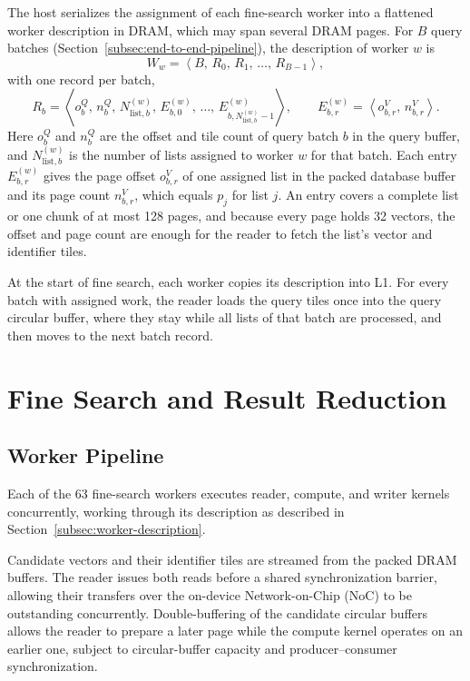 The host serializes the assignment of each fine-search worker into a
flattened worker description in DRAM, which may span several DRAM pages. For
\(B\) query batches (Section~\ref{subsec:end-to-end-pipeline}), the
description of worker \(w\) is
\begin{equation}
W_w=\left\langle B,\,R_0,\,R_1,\,\ldots,\,R_{B-1}\right\rangle,
\label{eq:worker-description}
\end{equation}
with one record per batch,
\begin{equation}
R_b=\left\langle o^{Q}_b,\,n^{Q}_b,\,N^{(w)}_{\mathrm{list},b},\,
E^{(w)}_{b,0},\,\ldots,\,E^{(w)}_{b,N^{(w)}_{\mathrm{list},b}-1}\right\rangle,
\qquad
E^{(w)}_{b,r}=\left\langle o^{V}_{b,r},\,n^{V}_{b,r}\right\rangle.
\label{eq:worker-batch-record}
\end{equation}
Here \(o^{Q}_b\) and \(n^{Q}_b\) are the offset and tile count of query batch
\(b\) in the query buffer, and \(N^{(w)}_{\mathrm{list},b}\) is the number of
lists assigned to worker \(w\) for that batch. Each entry
\(E^{(w)}_{b,r}\) gives the page offset \(o^{V}_{b,r}\) of one assigned list in
the packed database buffer and its page count \(n^{V}_{b,r}\), which equals
\(p_j\) for list \(j\). An entry covers a complete list or one chunk of at most 128 pages, and because
every page holds 32 vectors, the offset and page count are enough for the
reader to fetch the list's vector and identifier tiles.

At the start of fine search, each worker copies its description into L1. For
every batch with assigned work, the reader loads the query tiles once into the
query circular buffer, where they stay while all lists of that batch are
processed, and then moves to the next batch record.

\section{Fine Search and Result Reduction}
\label{sec:fine-search-and-reduction}

\subsection{Worker Pipeline}
\label{subsec:fine-worker-pipeline}

Each of the 63 fine-search workers executes reader, compute, and writer kernels concurrently, working through its description as described in Section~\ref{subsec:worker-description}.

Candidate vectors and their identifier tiles are streamed from the packed DRAM buffers. The reader issues both reads before a shared synchronization barrier, allowing their transfers over the on-device Network-on-Chip (NoC) to be outstanding concurrently. Double-buffering of the candidate circular buffers allows the reader to prepare a later page while the compute kernel operates on an earlier one, subject to circular-buffer capacity and producer--consumer synchronization.

